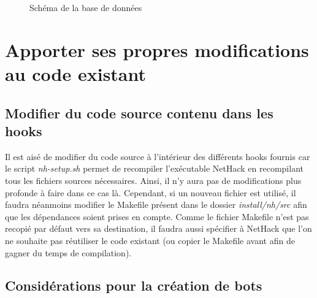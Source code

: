 \documentclass[10pt,a4paper]{report}
\begin{document}
\begin{figure}[H]
	\caption{\label{fig:database} Schéma de la base de données}
\end{figure}

\chapter{Apporter ses propres modifications au code existant}
\section{Modifier du code source contenu dans les hooks}
Il est aisé de modifier du code source à l'intérieur des différents hooks
fournis car le script \emph{nh-setup.sh} permet de recompiler l'exécutable
NetHack en recompilant tous les fichiers sources nécessaires. Ainsi, il n'y aura
pas de modifications plus profonde à faire dans ce cas là. Cependant, si un
nouveau fichier est utilisé, il faudra néanmoins modifier le Makefile présent
dans le dossier \emph{install/nh/src} afin que les dépendances soient prises en
compte. Comme le fichier Makefile n'est pas recopié par défaut vers sa
destination, il faudra aussi spécifier à NetHack que l'on ne souhaite pas
réutiliser le code existant (ou copier le Makefile avant afin de gagner du temps
de compilation).


\section{Considérations pour la création de bots}
\end{document}
